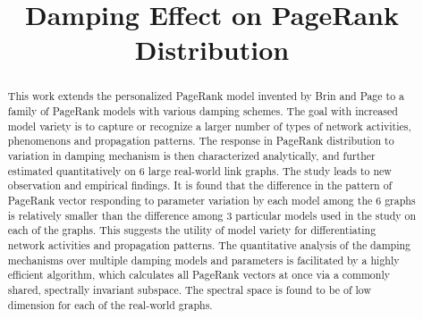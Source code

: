 \documentclass[conference]{IEEEtran}
\title{\LARGE Damping Effect on PageRank Distribution}
\author{%
  \IEEEauthorblockN{%
    Tiancheng Liu,
    Yuchen Qian,
    Xi Chen, and
    Xiaobai Sun
    \\ 
    \IEEEauthorblockA{%
    \begin{tabular}{c}
      Department of Computer Science, Duke University, Durham, NC 27708, USA
    \end{tabular}%
  }%
}}
\begin{document}

\ifdefined\hpec\else
  \doublespacing
\fi




%
\ifdefined\hpec
  \maketitle

%
\else


  \maketitle


  \tableofcontents
  \clearpage

\fi



\begin{abstract}
  This work extends the personalized PageRank model invented by Brin and
  Page to a family of PageRank models with various damping schemes. The
  goal with increased model variety is to capture or recognize a larger
  number of types of network activities, phenomenons and
  propagation patterns. The response in PageRank distribution
  to variation in damping mechanism is then characterized analytically,
  and further estimated quantitatively on $6$ large real-world link
  graphs. The study leads to new observation and empirical findings. It
  is found that the difference in the pattern of PageRank vector
  responding to parameter variation by each model among the $6$ graphs is
  relatively smaller than the difference among $3$ particular models
  used in the study on each of the graphs. This suggests the utility of
  model variety for differentiating network activities and propagation
  patterns. The quantitative analysis of the damping mechanisms over 
  multiple damping models and parameters is facilitated by a highly efficient algorithm,
  which calculates all PageRank vectors at once via a commonly shared,
  spectrally invariant subspace. The spectral space is
  found to be of low dimension for each of the real-world graphs.
\end{abstract}
\end{document}
